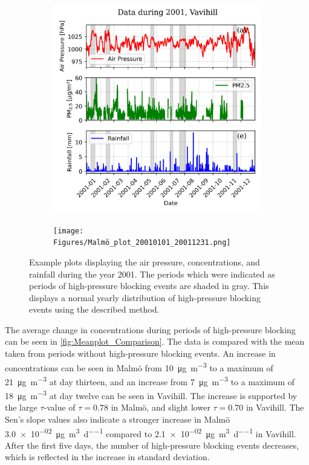 \begin{figure}[H]
    \centering
    \begin{subfigure}[b]{0.49\textwidth}
        \centering
        \includegraphics[width=\textwidth]{Figures/Vavihill_plot_20010101_20011231.png}
        \label{fig:2001Vavihill}
    \end{subfigure}
    \hfill
    \begin{subfigure}[b]{0.49\textwidth}
        \centering
        \texttt{[image: Figures/Malmö\_plot\_20010101\_20011231.png]}
        \label{fig:2001Malmö}
    \end{subfigure}
    \caption{Example plots displaying the air pressure, \PM concentrations, and rainfall during the year 2001. The periods which were indicated as periods of high-pressure blocking events are shaded in gray. This displays a normal yearly distribution of high-pressure blocking events using the described method.}
    \label{fig:2001}
\end{figure}

The average change in \PM concentrations during periods of high-pressure blocking can be seen in \autoref{fig:Meanplot_Comparison}. The data is compared with the \PM mean taken from periods without high-pressure blocking events. An increase in \PM concentrations can be seen in Malmö from \SI{10}{\micro\gram\per\meter\cubed} to a maximum of \SI{21}{\micro\gram\per\meter\cubed} at day thirteen, and an increase from \SI{7}{\micro\gram\per\meter\cubed} to a maximum of \SI{18}{\micro\gram\per\meter\cubed} at day twelve can be seen in Vavihill. The increase is supported by the large $\tau$-value of $\tau=0.78$ in Malmö, and slight lower $\tau=0.70$ in Vavihill. The Sen's slope values also indicate a stronger increase in Malmö \SI{3.0e-02}{\micro\gram\per\meter\cubed\per\day} compared to \SI{2.1e-02}{\micro\gram\per\meter\cubed\per\day} in Vavihill. After the first five days, the number of high-pressure blocking events decreases, which is reflected in the increase in standard deviation. 


